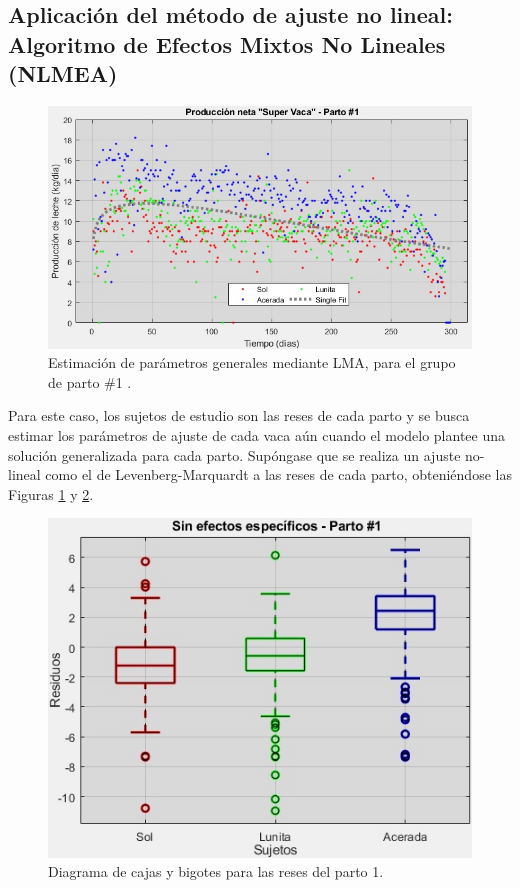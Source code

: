 
\subsection{Aplicación del método de ajuste no lineal: Algoritmo de Efectos Mixtos No Lineales (NLMEA)}

\begin{figure}[H]
	 \begin{center}
	 \includegraphics[scale=0.649]{img/nlinfit1spa.jpg}
	 \end{center}
	 \caption{Estimación de parámetros generales  mediante LMA, para el grupo de parto \#1 . \label{nlinfit1png}}
\end{figure}

Para este caso, los sujetos de estudio son las reses de cada parto y se busca estimar los parámetros de ajuste de cada vaca aún cuando el modelo plantee una solución generalizada para cada parto. Supóngase que se realiza un ajuste no-lineal como el de Levenberg-Marquardt a las reses de cada parto, obteniéndose las Figuras \ref{nlinfit1png} y \ref{nlinfitbox1png}.

\begin{figure}[H]
	 \begin{center}
	 \includegraphics[scale=0.627]{img/nlinfitbox1spa.jpg}
	 \end{center}
	 \caption{Diagrama de cajas y bigotes para las reses del parto 1. \label{nlinfitbox1png}}
\end{figure}

